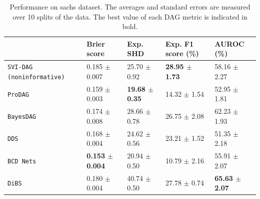 \begin{table}[ht]
\centering
\caption{Performance on sachs dataset. The averages and standard errors are measured over 10 splits of the data. The best value of each DAG metric is indicated in bold.}
\label{tab:sachs_dag}
\small
\begin{tabularx}{\linewidth}{XXXXX}
\toprule
 & Brier score & Exp. SHD & Exp. F1 score (\%) & AUROC (\%) \\
\midrule
\texttt{SVI-DAG (noninformative)} & 0.185 $\pm$ 0.007 & 25.70 $\pm$ 0.92 & \textbf{28.95 $\pm$ 1.73} & 58.16 $\pm$ 2.27 \\
\texttt{ProDAG} & 0.159 $\pm$ 0.003 & \textbf{19.68 $\pm$ 0.35} & 14.32 $\pm$ 1.54 & 52.95 $\pm$ 1.81 \\
\texttt{BayesDAG} & 0.174 $\pm$ 0.008 & 28.66 $\pm$ 0.78 & 26.75 $\pm$ 2.08 & 62.23 $\pm$ 1.93 \\
\texttt{DDS} & 0.168 $\pm$ 0.004 & 24.62 $\pm$ 0.56 & 23.21 $\pm$ 1.52 & 51.35 $\pm$ 2.18 \\
\texttt{BCD Nets} & \textbf{0.153 $\pm$ 0.004} & 20.94 $\pm$ 0.50 & 10.79 $\pm$ 2.16 & 55.91 $\pm$ 2.07 \\
\texttt{DiBS} & 0.180 $\pm$ 0.004 & 40.74 $\pm$ 0.50 & 27.78 $\pm$ 0.74 & \textbf{65.63 $\pm$ 2.07} \\
\bottomrule
\end{tabularx}
\end{table}